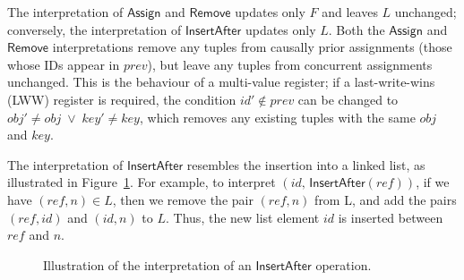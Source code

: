 The interpretation of $\mathsf{Assign}$ and $\mathsf{Remove}$ updates only $F$ and leaves $L$ unchanged; conversely, the interpretation of $\mathsf{InsertAfter}$ updates only $L$.
Both the $\mathsf{Assign}$ and $\mathsf{Remove}$ interpretations remove any tuples from causally prior assignments (those whose IDs appear in $\mathit{prev}$), but leave any tuples from concurrent assignments unchanged.
This is the behaviour of a multi-value register; if a last-write-wins (LWW) register is required, the condition $\mathit{id}' \notin \mathit{prev}$ can be changed to $\mathit{obj}' \neq \mathit{obj} \;\vee\; \mathit{key}' \neq \mathit{key}$, which removes any existing tuples with the same $\mathit{obj}$ and $\mathit{key}$.

The interpretation of $\mathsf{InsertAfter}$ resembles the insertion into a linked list, as illustrated in Figure~\ref{fig:list-insert}.
For example, to interpret $(\mathit{id},\, \mathsf{InsertAfter}(\mathit{ref}))$, if we have $(\mathit{ref}, n) \in L$, then we remove the pair $(\mathit{ref}, n)$ from L, and add the pairs $(\mathit{ref}, \mathit{id})$ and $(\mathit{id}, n)$ to $L$.
Thus, the new list element $\mathit{id}$ is inserted between $\mathit{ref}$ and $n$.

\begin{figure}
\centering
{}
\caption{Illustration of the interpretation of an $\mathsf{InsertAfter}$ operation.}\label{fig:list-insert}
\end{figure}

